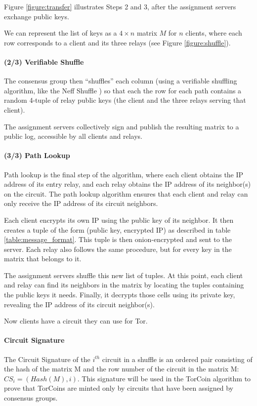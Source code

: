 Figure \ref{figure:transfer} illustrates Steps 2 and 3, after the assignment
servers exchange public keys.

We can represent the list of keys as a $4 \times n$ matrix $M$ for $n$
clients, where each row corresponds to a client and its three relays (see
Figure \ref{figure:shuffle}).




\paragraph{(2/3) Verifiable Shuffle} The consensus group then ``shuffles''
each column (using a verifiable shuffling algorithm, like the Neff Shuffle
\cite{neff2001verifiable}) so that each the row for each path
contains a random 4-tuple of relay public keys
(the client and the three relays serving that client).

The assignment servers collectively sign and publish the resulting matrix to a
public log, accessible by all clients and relays.

\paragraph{(3/3) Path Lookup}
Path lookup is the final step of the algorithm, where each client obtains the
IP address of its entry relay, and each relay obtains the IP address of its
neighbor(s) on the circuit. The path lookup algorithm ensures that each client
and relay can only receive the IP address of its circuit neighbors.

Each client encrypts its own IP using the public key of its neighbor. It then
creates a tuple of the form (public key, encrypted IP) as described in table
\ref{table:message_format}. This tuple is then onion-encrypted and sent to the
server.  Each relay also follows the same procedure, but for every key in the
matrix that belongs to it.

The assignment servers shuffle this new list of tuples. At this point, each
client and relay can find its neighbors in the matrix by locating the tuples
containing the public keys it needs. Finally, it decrypts those cells using
its private key, revealing the IP address of its circuit neighbor(s).

Now clients have a circuit they can use for Tor.



\paragraph{Circuit Signature} The Circuit Signature of the $i^{th}$ circuit in
a shuffle is an ordered pair consisting of the hash of the matrix M and the
row number of the circuit in the matrix M: $CS_i = (Hash(M), i)$. This
signature will be used in the TorCoin algorithm to prove that TorCoins are
minted only by circuits that have been assigned by consensus groups.

